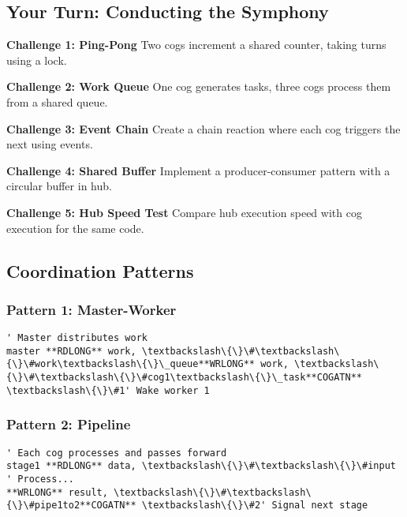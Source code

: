 \documentclass[11pt]{book}
\begin{document}
\hypertarget{your-turn-conducting-the-symphony}{%
\subsection{Your Turn: Conducting the
Symphony}\label{your-turn-conducting-the-symphony}}

\begin{yourturn}
\textbf{Challenge 1: Ping-Pong}
Two cogs increment a shared counter, taking turns using a lock.

\textbf{Challenge 2: Work Queue}
One cog generates tasks, three cogs process them from a shared queue.

\textbf{Challenge 3: Event Chain}
Create a chain reaction where each cog triggers the next using events.

\textbf{Challenge 4: Shared Buffer}
Implement a producer-consumer pattern with a circular buffer in hub.

\textbf{Challenge 5: Hub Speed Test}
Compare hub execution speed with cog execution for the same code.
\end{yourturn}

\hypertarget{coordination-patterns}{%
\subsection{Coordination Patterns}\label{coordination-patterns}}

\hypertarget{pattern-1-master-worker}{%
\subsubsection{Pattern 1: Master-Worker}\label{pattern-1-master-worker}}

\begin{lstlisting}
' Master distributes work
master **RDLONG** work, \textbackslash\{\}\#\textbackslash\{\}\#work\textbackslash\{\}\_queue**WRLONG** work, \textbackslash\{\}\#\textbackslash\{\}\#cog1\textbackslash\{\}\_task**COGATN** \textbackslash\{\}\#1' Wake worker 1
\end{lstlisting}

\hypertarget{pattern-2-pipeline}{%
\subsubsection{Pattern 2: Pipeline}\label{pattern-2-pipeline}}

\begin{lstlisting}
' Each cog processes and passes forward
stage1 **RDLONG** data, \textbackslash\{\}\#\textbackslash\{\}\#input        ' Process...
**WRLONG** result, \textbackslash\{\}\#\textbackslash\{\}\#pipe1to2**COGATN** \textbackslash\{\}\#2' Signal next stage
\end{lstlisting}
\end{document}
